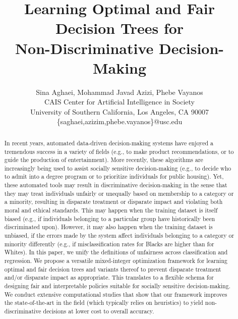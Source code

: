 \documentclass[letterpaper]{article} %
\theoremstyle{definition}
\newcommand{\1}{\ensuremath{{\rm e}}} %
\begin{document}
 
%
\title{Learning Optimal and Fair Decision Trees for \\ Non-Discriminative Decision-Making}
\author{Sina Aghaei, Mohammad Javad Azizi, Phebe Vayanos\\
CAIS Center for Artificial Intelligence in Society\\
  University of Southern California, Los Angeles, CA 90007 \\
  \{saghaei,azizim,phebe.vayanos\}@usc.edu
}
\maketitle
\begin{abstract}
In recent years, automated data-driven decision-making systems have enjoyed a tremendous success in a variety of fields (e.g., to make product recommendations, or to guide the production of entertainment). More recently, these algorithms are increasingly being used to assist socially sensitive decision-making (e.g., to decide who to admit into a degree program or to prioritize individuals for public housing). Yet, these automated tools may result in discriminative decision-making in the sense that they may treat individuals unfairly or unequally based on membership to a category or a minority, resulting in disparate treatment or disparate impact and violating both moral and ethical standards. This may happen when the training dataset is itself biased (e.g., if individuals belonging to a particular group have historically been discriminated upon). However, it may also happen when the training dataset is unbiased, if the errors made by the system affect individuals belonging to a category or minority differently (e.g., if misclassification rates for Blacks are higher than for Whites). In this paper, we unify the definitions of unfairness across classification and regression. We propose a versatile mixed-integer optimization framework for learning optimal and fair decision trees and variants thereof to prevent disparate treatment and/or disparate impact as appropriate. This translates to a flexible schema for designing fair and interpretable policies suitable for socially sensitive decision-making. We conduct extensive computational studies that show that our framework improves the state-of-the-art in the field (which typically relies on heuristics) to yield non-discriminative decisions at lower cost to overall accuracy.
\end{abstract}
\end{document}
